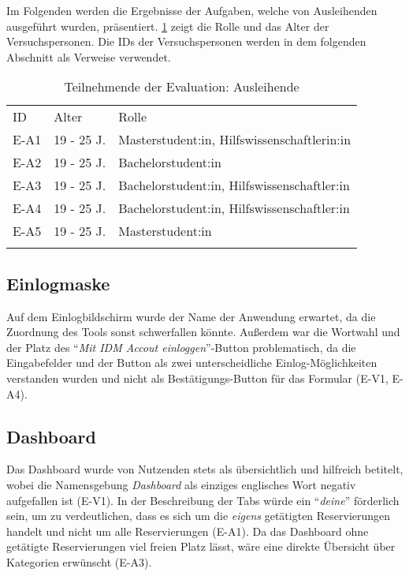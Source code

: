 Im Folgenden werden die Ergebnisse der Aufgaben, welche von Ausleihenden ausgeführt wurden,
präsentiert. \ref{table:azwei} zeigt die Rolle und das Alter der Versuchspersonen. Die IDs der
Versuchspersonen werden in dem folgenden Abschnitt als Verweise verwendet.

\begin{table}[h]
  \centering
  \caption{Teilnehmende der Evaluation: Ausleihende}
  \begin{tabular}{lll}
    \arrayrulecolor{maincolor}\hline
    \sffamily\color{maincolor}ID & \sffamily\color{maincolor}Alter &
    \sffamily\color{maincolor}Rolle                                  \\
    \arrayrulecolor{maincolor}\hline
    E-A1                         & 19 - 25 J.                      &
    Masterstudent:in, Hilfswissenschaftlerin:in                      \\
    E-A2                         & 19 - 25 J.                      &
    Bachelorstudent:in                                               \\
    E-A3                         & 19 - 25 J.                      &
    Bachelorstudent:in, Hilfswissenschaftler:in                      \\
    E-A4                         & 19 - 25 J.                      &
    Bachelorstudent:in, Hilfswissenschaftler:in                      \\
    E-A5                         & 19 - 25 J.                      &
    Masterstudent:in                                                 \\
    \arrayrulecolor{maincolor}\hline
  \end{tabular}
  \label{table:azwei}
\end{table}

\subsection{Einlogmaske}
Auf dem Einlogbildschirm wurde der Name der Anwendung erwartet, da die
Zuordnung des Tools sonst schwerfallen könnte. Außerdem war die Wortwahl und der
Platz des \enquote{\textit{Mit IDM Accout einloggen}}-Button problematisch, da die
Eingabefelder und der Button als zwei unterscheidliche Einlog-Möglichkeiten verstanden
wurden und nicht als Bestätigungs-Button für das Formular (E-V1, E-A4).

\subsection{Dashboard}
Das Dashboard wurde von Nutzenden stets als übersichtlich und hilfreich
betitelt, wobei die Namensgebung \textit{Dashboard} als einziges englisches
Wort negativ aufgefallen ist (E-V1). In der Beschreibung der Tabs würde ein
\enquote{\textit{deine}} förderlich sein, um zu verdeutlichen, dass es sich um die \textit{eigens}
getätigten Reservierungen handelt und nicht um alle Reservierungen (E-A1). Da
das Dashboard ohne getätigte Reservierungen viel freien Platz lässt, wäre eine
direkte Übersicht über Kategorien erwünscht (E-A3). 

